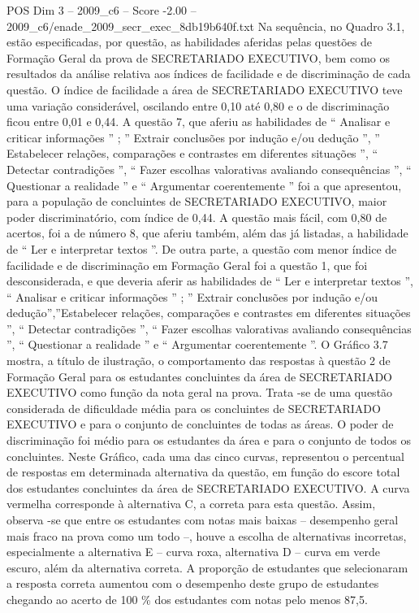 \begin{textsample}{POS Dim 3 – 2009\_c6 – Score -2.00 – 2009\_c6/enade\_2009\_secr\_exec\_8db19b640f.txt}
Na sequência, no Quadro 3.1, estão especificadas, por questão, as habilidades aferidas pelas questões de Formação Geral da prova de SECRETARIADO EXECUTIVO, bem como os resultados da análise relativa aos índices de facilidade e de discriminação de cada questão.
O índice de facilidade a área de SECRETARIADO EXECUTIVO teve uma variação considerável, oscilando entre 0,10 até 0,80 e o de discriminação ficou entre 0,01 e 0,44.
A questão 7, que aferiu as habilidades de “ Analisar e criticar informações ” ; ” Extrair conclusões por indução e/ou dedução ”, ” Estabelecer relações, comparações e contrastes em diferentes situações ”, “ Detectar contradições ”, “ Fazer escolhas valorativas avaliando consequências ”, “ Questionar a realidade ” e “ Argumentar coerentemente ” foi a que apresentou, para a população de concluintes de SECRETARIADO EXECUTIVO, maior poder discriminatório, com índice de 0,44.
A questão mais fácil, com 0,80 de acertos, foi a de número 8, que aferiu também, além das já listadas, a habilidade de “ Ler e interpretar textos ”.
De outra parte, a questão com menor índice de facilidade e de discriminação em Formação Geral foi a questão 1, que foi desconsiderada, e que deveria aferir as habilidades de “ Ler e interpretar textos ”, “ Analisar e criticar informações ” ; ” Extrair conclusões por indução e/ou dedução”,”Estabelecer relações, comparações e contrastes em diferentes situações ”, “ Detectar contradições ”, “ Fazer escolhas valorativas avaliando consequências ”, “ Questionar a realidade ” e “ Argumentar coerentemente ”.
O Gráfico 3.7 mostra, a título de ilustração, o comportamento das respostas à questão 2 de Formação Geral para os estudantes concluintes da área de SECRETARIADO EXECUTIVO como função da nota geral na prova.
Trata -se de uma questão considerada de dificuldade média para os concluintes de SECRETARIADO EXECUTIVO e para o conjunto de concluintes de todas as áreas.
O poder de discriminação foi médio para os estudantes da área e para o conjunto de todos os concluintes.
Neste Gráfico, cada uma das cinco curvas, representou o percentual de respostas em determinada alternativa da questão, em função do escore total dos estudantes concluintes da área de SECRETARIADO EXECUTIVO.
A curva vermelha corresponde à alternativa C, a correta para esta questão.
Assim, observa -se que entre os estudantes com notas mais baixas – desempenho geral mais fraco na prova como um todo –, houve a escolha de alternativas incorretas, especialmente a alternativa E – curva roxa, alternativa D – curva em verde escuro, além da alternativa correta.
A proporção de estudantes que selecionaram a resposta correta aumentou com o desempenho deste grupo de estudantes chegando ao acerto de 100 \% dos estudantes com notas pelo menos 87,5.

\end{textsample}
